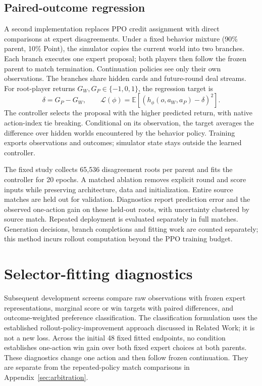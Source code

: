 \documentclass[11pt]{article}
\begin{document}
\subsection{Paired-outcome regression}
A second implementation replaces PPO credit assignment with direct comparisons
at expert disagreements. Under a fixed behavior mixture (90\% parent, 10\%
Point), the simulator copies the current world into two branches. Each branch
executes one expert proposal; both players then follow the frozen parent to
match termination. Continuation policies see only their own observations.
The branches share hidden cards and future-round deal streams. For root-player
returns $G_W,G_P\in\{-1,0,1\}$, the regression target is
\begin{equation}
  \delta=G_P-G_W, \qquad
  \mathcal{L}(\phi)=\mathbb{E}[(h_\phi(o,a_W,a_P)-\delta)^2].
\end{equation}
The controller selects the proposal with the higher predicted return, with
native action-index tie breaking. Conditional on its observation, the target
averages the difference over hidden worlds encountered by the behavior policy.
Training exports observations and outcomes; simulator state stays outside the
learned controller.

The fixed study collects 65,536 disagreement roots per parent and fits the
controller for 20 epochs. A matched ablation removes explicit round and score
inputs while preserving architecture, data and initialization. Entire source
matches are held out for validation. Diagnostics report prediction error and
the observed one-action gain on these held-out roots, with uncertainty clustered
by source match. Repeated deployment is evaluated separately in full matches.
Generation decisions, branch completions and fitting work are counted separately;
this method incurs rollout computation beyond the PPO training budget.

\section{Selector-fitting diagnostics}
Subsequent development screens compare raw observations with frozen expert
representations, marginal score or win targets with paired differences, and
outcome-weighted preference classification. The classification formulation
uses the established rollout-policy-improvement approach discussed in Related
Work; it is not a new loss. Across the initial 48 fixed fitted endpoints, no condition
establishes one-action win gain over both fixed expert choices at both parents.
These diagnostics change one action and then follow frozen continuation.
They are separate from the repeated-policy match comparisons in
Appendix~\ref{sec:arbitration}.
\end{document}
